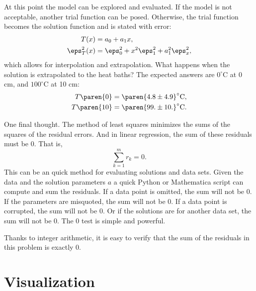 At this point the model can be explored and evaluated. If the model is not acceptable, another trial function can be posed. Otherwise, the trial function becomes the solution function and is stated with error:
  \begin{equation*}   %
  \begin{split}
    T(x)         & = a_{0} + a_{1} x, \\
    \eps_{T}^{2}(x) & = \eps_{0}^{2} + x^{2} \eps_{1}^{2} + a_{1}^{2} \eps_{x}^{2} , \\
  \end{split}
  \end{equation*}
which allows for interpolation and extrapolation. What happens when the solution is extrapolated to the heat baths? The expected answers are $0^{\circ}$C at 0 cm, and $100^{\circ}$C at 10 cm:
  \begin{equation*}   %
  \begin{split}
      T \paren{0}  &= \paren{ 4.8 \pm 4.9 }^{\circ}\mathrm{C}, \\
      T \paren{10} &= \paren{ 99. \pm 10. }^{\circ}\mathrm{C}.
  \end{split}
  \end{equation*}
  
One final thought. The method of least squares minimizes the sums of the squares of the residual errors. And in linear regression, the sum of these residuals must be 0. That is,
  \begin{equation*}   %
    \sum_{k=1}^{m} r_{k} = 0 .
  \end{equation*}
This can be an quick method for evaluating solutions and data sets. Given the data and the solution parameters $a$ a quick Python or Mathematica script can compute and sum the residuals. If a data point is omitted, the sum will not be 0. If the parameters are misquoted, the sum will not be 0. If a data point is corrupted, the sum will not be 0. Or if the solutions are for another data set, the sum will not be 0. The 0 test is simple and powerful.

Thanks to integer arithmetic, it is easy to verify that the sum of the residuals in this problem is exactly 0.

\section{Visualization}  %

